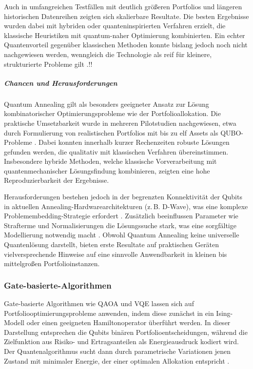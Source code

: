 Auch in umfangreichen Testfällen mit deutlich größeren Portfolios und längeren historischen Datenreihen zeigten sich skalierbare Resultate. Die besten Ergebnisse wurden dabei mit hybriden oder quanteninspirierten Verfahren erzielt, die klassische Heuristiken mit quantum-naher Optimierung kombinierten. Ein echter Quantenvorteil gegenüber klassischen Methoden konnte bislang jedoch noch nicht nachgewiesen werden, wenngleich die Technologie als reif für kleinere, strukturierte Probleme gilt \cite{BBVA, 2020}.!!

\subparagraph{Chancen und Herausforderungen}

Quantum Annealing gilt als besonders geeigneter Ansatz zur Lösung kombinatorischer Optimierungsprobleme wie der Portfolioallokation. Die praktische Umsetzbarkeit wurde in mehreren Pilotstudien nachgewiesen, etwa durch Formulierung von realistischen Portfolios mit bis zu elf Assets als QUBO-Probleme \cite[S. 6]{orus_quantum_2019}. Dabei konnten innerhalb kurzer Rechenzeiten robuste Lösungen gefunden werden, die qualitativ mit klassischen Verfahren übereinstimmen. Insbesondere hybride Methoden, welche klassische Vorverarbeitung mit quantenmechanischer Lösungsfindung kombinieren, zeigten eine hohe Reproduzierbarkeit der Ergebnisse.

Herausforderungen bestehen jedoch in der begrenzten Konnektivität der Qubits in aktuellen Annealing-Hardwarearchitekturen (z.\,B. D-Wave), was eine komplexe Problemembedding-Strategie erfordert \cite[S. 9]{orus_quantum_2019}. Zusätzlich beeinflussen Parameter wie Strafterme und Normalisierungen die Lösungssuche stark, was eine sorgfältige Modellierung notwendig macht \cite[S. 10]{sakuler_real-world_2025}. Obwohl Quantum Annealing keine universelle Quantenlösung darstellt, bieten erste Resultate auf praktischen Geräten vielversprechende Hinweise auf eine sinnvolle Anwendbarkeit in kleinen bis mittelgroßen Portfolioinstanzen.

\subsubsection*{Gate-basierte-Algorithmen}
 
Gate-basierte Algorithmen wie QAOA und VQE lassen sich auf Portfoliooptimierungsprobleme anwenden, indem diese zunächst in ein Ising-Modell oder einen geeigneten Hamiltonoperator überführt werden. In dieser Darstellung entsprechen die Qubits binären Portfolioentscheidungen, während die Zielfunktion aus Risiko- und Ertragsanteilen als Energieausdruck kodiert wird. Der Quantenalgorithmus sucht dann durch parametrische Variationen jenen Zustand mit minimaler Energie, der einer optimalen Allokation entspricht \cite{buonaiuto_best_2023, brandhofer_benchmarking_2022}.

